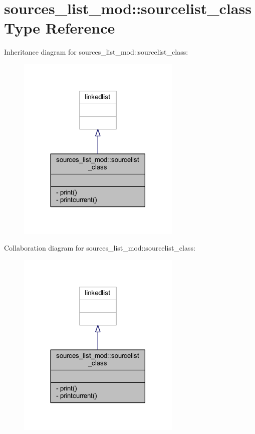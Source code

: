 \hypertarget{structsources__list__mod_1_1sourcelist__class}{}\section{sources\+\_\+list\+\_\+mod\+:\+:sourcelist\+\_\+class Type Reference}
\label{structsources__list__mod_1_1sourcelist__class}


Inheritance diagram for sources\+\_\+list\+\_\+mod\+:\+:sourcelist\+\_\+class\+:\nopagebreak
\begin{figure}[H]
\begin{center}
\leavevmode
\includegraphics[width=221pt]{structsources__list__mod_1_1sourcelist__class__inherit__graph}
\end{center}
\end{figure}


Collaboration diagram for sources\+\_\+list\+\_\+mod\+:\+:sourcelist\+\_\+class\+:\nopagebreak
\begin{figure}[H]
\begin{center}
\leavevmode
\includegraphics[width=221pt]{structsources__list__mod_1_1sourcelist__class__coll__graph}
\end{center}
\end{figure}

